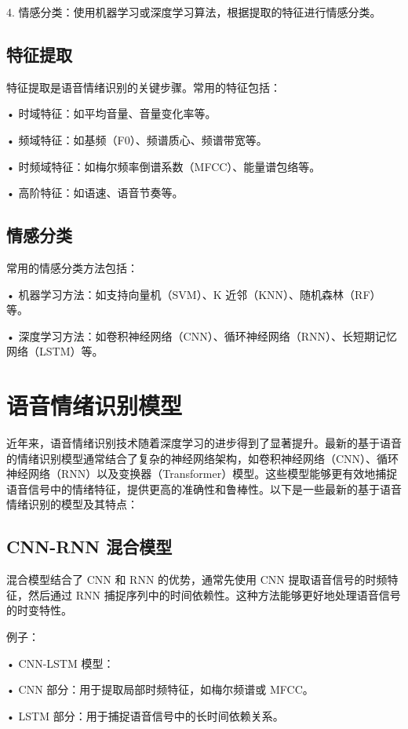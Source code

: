 \documentclass[lang=cn,newtx,12pt,scheme=chinese]{elegantbook}
\begin{document}
	4.	情感分类：使用机器学习或深度学习算法，根据提取的特征进行情感分类。

\subsection{特征提取}

特征提取是语音情绪识别的关键步骤。常用的特征包括：

	•	时域特征：如平均音量、音量变化率等。
	
	•	频域特征：如基频（F0）、频谱质心、频谱带宽等。
	
	•	时频域特征：如梅尔频率倒谱系数（MFCC）、能量谱包络等。
	
	•	高阶特征：如语速、语音节奏等。
	
\subsection{情感分类}

常用的情感分类方法包括：

	•	机器学习方法：如支持向量机（SVM）、K 近邻（KNN）、随机森林（RF）等。
	
	•	深度学习方法：如卷积神经网络（CNN）、循环神经网络（RNN）、长短期记忆网络（LSTM）等。
	
\section{语音情绪识别模型}

近年来，语音情绪识别技术随着深度学习的进步得到了显著提升。最新的基于语音的情绪识别模型通常结合了复杂的神经网络架构，如卷积神经网络（CNN）、循环神经网络（RNN）以及变换器（Transformer）模型。这些模型能够更有效地捕捉语音信号中的情绪特征，提供更高的准确性和鲁棒性。以下是一些最新的基于语音情绪识别的模型及其特点：

\subsection{CNN-RNN 混合模型}

混合模型结合了 CNN 和 RNN 的优势，通常先使用 CNN 提取语音信号的时频特征，然后通过 RNN 捕捉序列中的时间依赖性。这种方法能够更好地处理语音信号的时变特性。

例子：

	•	CNN-LSTM 模型：
	
	
	•	CNN 部分：用于提取局部时频特征，如梅尔频谱或 MFCC。
	
	•	LSTM 部分：用于捕捉语音信号中的长时间依赖关系。
	
\end{document}
